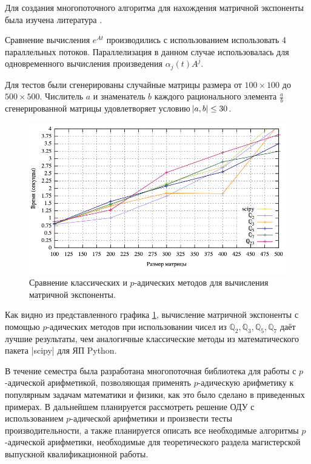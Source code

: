 \documentclass[master, och, times, nir]{sty/SCWorks}
\begin{document}
Для создания многопоточного алгоритма для нахождения матричной экспоненты была изучена литература \cite{bib:numbers:morrison, bib:numbers:dixon, bib:ode:3, bib:numbers:limongelli, bib:numbers:mignotte}.

Сравнение вычисления $e^{At}$ производились с использованием использовать 4 параллельных потоков. Параллелизация в данном случае использовалась для одновременного вычисления произведения $\alpha_{j}(t)A^j$.

Для тестов были сгенерированы случайные матрицы размера от \mbox{$100 \times 100$} до \mbox{$500 \times 500$}. Числитель $a$ и знаменатель $b$ каждого рационального элемента $\frac{a}{b}$ сгенерированной матрицы удовлетворяет условию $\abs{a,b} \leq 30$.


\begin{figure}[H]
\centerline{\includegraphics[width=0.85\linewidth]{../gnuplot/exp/plot.png}}
\caption{Сравнение классических и $p$-адических методов для вычисления матричной экспоненты.}
\label{img:exp:plot}
\end{figure}

Как видно из представленного графика \ref{img:exp:plot}, вычисление матричной экспоненты с помощью $p$-адических методов при использовании чисел из $\mathbb{Q}_2, \mathbb{Q}_3, \mathbb{Q}_5, \mathbb{Q}_7$ даёт лучшие результаты, чем аналогичные классические методы из математического пакета |scipy| для ЯП Python.

\conclusion
В течение семестра была разработана многопоточная библиотека для работы с $p$-адической арифметикой, позволяющая применять $p$-адическую арифметику к популярным задачам математики и физики, как это было сделано в приведенных примерах. В дальнейшем планируется рассмотреть решение ОДУ с использованием $p$-адической арифметики и произвести тесты производительности, а также планируется описать все необходимые алгоритмы $p$-адической арифметики, необходимые для теоретического раздела магистерской выпускной квалификационной работы.



\end{document}
